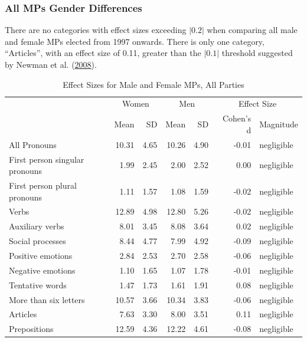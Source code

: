 \documentclass[]{article}
\theoremstyle{definition}
\theoremstyle{definition}
\theoremstyle{definition}
\theoremstyle{remark}
\begin{document}
\hypertarget{all-mps-gender-differences}{%
\subsubsection{All MPs Gender
Differences}\label{all-mps-gender-differences}}

There are no categories with effect sizes exceeding \(|0.2|\) when
comparing all male and female MPs elected from 1997 onwards. There is
only one category, ``Articles'', with an effect size of 0.11, greater
than the \(|0.1|\) threshold suggested by Newman et al.
(\protect\hyperlink{ref-newman2008}{2008}).

\begin{table}[H]

\caption{\label{tab:all-party-effect-sizes}Effect Sizes for Male and Female MPs, All Parties}
\centering
\begin{tabular}[t]{lrrrrrl}
\toprule
\multicolumn{1}{c}{ } & \multicolumn{2}{c}{Women} & \multicolumn{2}{c}{Men} & \multicolumn{2}{c}{Effect Size} \\
\cmidrule(l{2pt}r{2pt}){2-3} \cmidrule(l{2pt}r{2pt}){4-5} \cmidrule(l{2pt}r{2pt}){6-7}
 & Mean & SD & Mean & SD & Cohen's d & Magnitude\\
\midrule
All Pronouns & 10.31 & 4.65 & 10.26 & 4.90 & -0.01 & negligible\\
First person singular pronouns & 1.99 & 2.45 & 2.00 & 2.52 & 0.00 & negligible\\
First person plural pronouns & 1.11 & 1.57 & 1.08 & 1.59 & -0.02 & negligible\\
Verbs & 12.89 & 4.98 & 12.80 & 5.26 & -0.02 & negligible\\
Auxiliary verbs & 8.01 & 3.45 & 8.08 & 3.64 & 0.02 & negligible\\
\addlinespace
Social processes & 8.44 & 4.77 & 7.99 & 4.92 & -0.09 & negligible\\
Positive emotions & 2.84 & 2.53 & 2.70 & 2.58 & -0.06 & negligible\\
Negative emotions & 1.10 & 1.65 & 1.07 & 1.78 & -0.01 & negligible\\
Tentative words & 1.47 & 1.73 & 1.61 & 1.91 & 0.08 & negligible\\
More than six letters & 10.57 & 3.66 & 10.34 & 3.83 & -0.06 & negligible\\
\addlinespace
Articles & 7.63 & 3.30 & 8.00 & 3.51 & 0.11 & negligible\\
Prepositions & 12.59 & 4.36 & 12.22 & 4.61 & -0.08 & negligible\\

\end{tabular}
\end{table}
\end{document}
